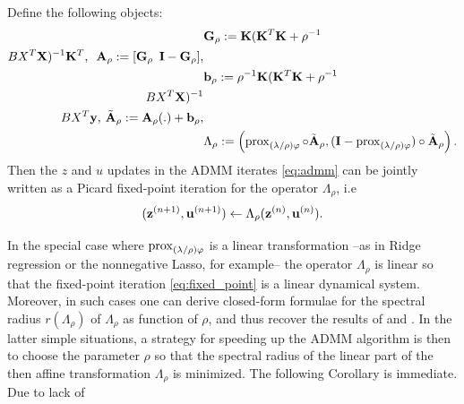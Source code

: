 \begin{lemma}
  Define the following objects:
  \begin{eqnarray*}
    \begin{aligned}
      &\mathbf{G}_{\rho} :=
      \mathbf{K}(\mathbf{K}^T\mathbf{K} + \rho^{-1}\\B{X}^T\mathbf{X})^{-1}\mathbf{K}^T,\hspace{.5em}
      \mathbf{A}_{\rho}:=[\mathbf{G}_{\rho}\hspace{.5em}\mathbf{I}-\mathbf{G}_{\rho}],\\
      &\mathbf{b}_{\rho} := \rho^{-1}\mathbf{K}(\mathbf{K}^T\mathbf{K} +
      \rho^{-1}\\B{X}^T\mathbf{X})^{-1}\\B{X}^T\mathbf{y},\hspace{.2em}\tilde{\mathbf{A}}_{\rho} :=
      \mathbf{A}_{\rho}(.) +  \mathbf{b}_{\rho},\\
      &\Lambda_{\rho} :=
        \left(\operatorname{prox}_{(\lambda/\rho)\varphi}\circ\tilde{\mathbf{A}}_{\rho},
        (\mathbf{I}-\operatorname{prox}_{(\lambda/\rho)\varphi})\circ\tilde{\mathbf{A}}_{\rho}\right).
    \end{aligned}
    \label{eq:factorize}
  \end{eqnarray*}
 Then the $z$ and $u$ updates in the ADMM iterates
\eqref{eq:admm} can be jointly written as a Picard fixed-point
iteration for the operator $\Lambda_{\rho}$, i.e
\begin{equation}
  (\mathbf{z}^{(n+1)}, \mathbf{u}^{(n+1)}) \leftarrow
  \Lambda_{\rho}(\mathbf{z}^{(n)}, \mathbf{u}^{(n)}).
      \label{eq:fixed_point}
\end{equation}
\label{thm:fixed_point}
\end{lemma}
 In the special case where
$\operatorname{prox}_{(\lambda/\rho)\varphi}$ is a linear transformation --as
in Ridge regression or the nonnegative
Lasso, for example-- the operator $\Lambda_{\rho}$ is linear so that the
fixed-point iteration
\eqref{eq:fixed_point} is a linear dynamical system. Moreover,
in such cases one can derive closed-form formulae for the spectral radius
$r(\Lambda_{\rho})$ of $\Lambda_{\rho}$ as function of $\rho$, and thus recover
the results of \citep{ghadimi2013optimal} and \citep{boley2013}. In the
latter simple situations, a strategy for speeding up the ADMM
algorithm is then to choose the parameter $\rho$ so that the spectral
radius of the linear part of the then affine transformation $\Lambda_\rho$
is minimized. The following Corollary is immediate. Due to lack of
